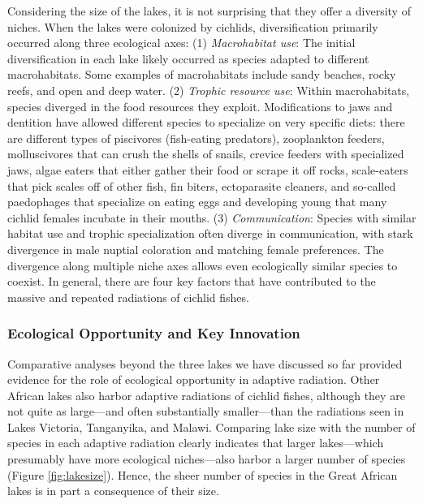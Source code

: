 \documentclass[
]{book}
\begin{document}
Considering the size of the lakes, it is not surprising that they offer a diversity of niches. When the lakes were colonized by cichlids, diversification primarily occurred along three ecological axes: (1) \emph{Macrohabitat use}: The initial diversification in each lake likely occurred as species adapted to different macrohabitats. Some examples of macrohabitats include sandy beaches, rocky reefs, and open and deep water. (2) \emph{Trophic resource use}: Within macrohabitats, species diverged in the food resources they exploit. Modifications to jaws and dentition have allowed different species to specialize on very specific diets: there are different types of piscivores (fish-eating predators), zooplankton feeders, molluscivores that can crush the shells of snails, crevice feeders with specialized jaws, algae eaters that either gather their food or scrape it off rocks, scale-eaters that pick scales off of other fish, fin biters, ectoparasite cleaners, and so-called paedophages that specialize on eating eggs and developing young that many cichlid females incubate in their mouths. (3) \emph{Communication}: Species with similar habitat use and trophic specialization often diverge in communication, with stark divergence in male nuptial coloration and matching female preferences. The divergence along multiple niche axes allows even ecologically similar species to coexist. In general, there are four key factors that have contributed to the massive and repeated radiations of cichlid fishes.

\hypertarget{ecological-opportunity-and-key-innovation}{%
\subsubsection*{Ecological Opportunity and Key Innovation}\label{ecological-opportunity-and-key-innovation}}

Comparative analyses beyond the three lakes we have discussed so far provided evidence for the role of ecological opportunity in adaptive radiation. Other African lakes also harbor adaptive radiations of cichlid fishes, although they are not quite as large---and often substantially smaller---than the radiations seen in Lakes Victoria, Tanganyika, and Malawi. Comparing lake size with the number of species in each adaptive radiation clearly indicates that larger lakes---which presumably have more ecological niches---also harbor a larger number of species (Figure \ref{fig:lakesize}). Hence, the sheer number of species in the Great African lakes is in part a consequence of their size.
\end{document}
